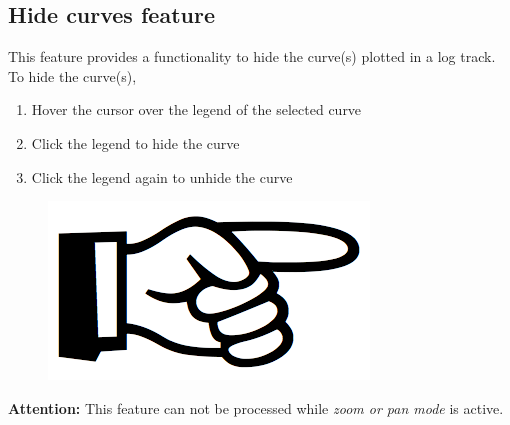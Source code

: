 \documentclass[12pt,a4paper,oneside]{report}
\begin{document}
\subsection{Hide curves feature}
This feature provides a functionality to hide the curve(s) plotted in a log track. To hide the curve(s),
\begin{enumerate}
\setlength\itemsep{0.1em}
\item Hover the cursor over the legend of the selected curve
\item Click the legend to hide the curve
\item Click the legend again to unhide the curve
\end{enumerate}

\begin{figure}
\vspace{-15pt}
\includegraphics[scale=0.08]{hand_point.png}
\end{figure}
\noindent\textbf{Attention:} This feature can not be processed while \emph{zoom or pan mode} is active.
\end{document}
